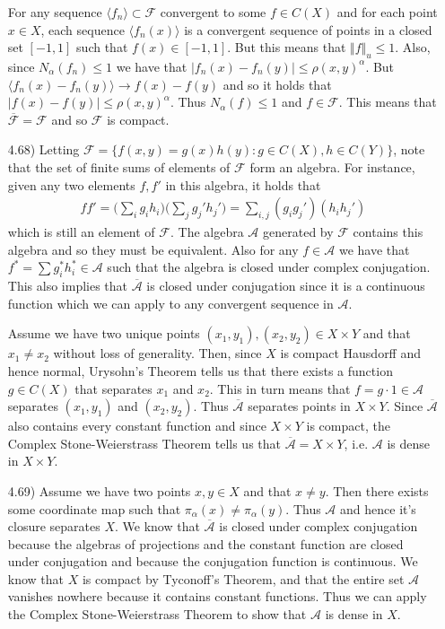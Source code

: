 \documentclass[11pt,letter]{article}
\begin{document}
\begin{enumerate}
    For any sequence $\langle f_n \rangle \subset \mathcal{F}$ convergent to some $f \in C(X)$ and for each point $x \in X$, each sequence $\langle f_n(x)\rangle$ is a convergent sequence of points in a closed set $[-1,1]$ such that $f(x) \in [-1,1]$. But this means that $\Vert f \Vert_u \le 1$. Also, since $N_\alpha(f_n) \le 1$ we have that $\vert f_n(x) - f_n(y) \vert \le \rho(x,y)^\alpha$. But $\langle f_n(x) - f_n(y) \rangle \rightarrow f(x) - f(y)$ and so it holds that $\vert f(x) - f(y) \vert \le \rho(x,y)^\alpha$. Thus $N_\alpha(f) \le 1$ and $f \in \mathcal{F}$. This means that $\overline{\mathcal{F}} = \mathcal{F}$ and so $\mathcal{F}$ is compact.

    \item [4.68)] Letting $\mathcal{F} = \{f(x,y) = g(x)h(y): g \in C(X), h \in C(Y)\}$, note that the set of finite sums of elements of $\mathcal{F}$ form an algebra. For instance, given any two elements $f,f'$ in this algebra, it holds that
    \begin{align*}
        ff' = \Big(\sum_i g_i h_i\Big)\Big(\sum_j g_j' h_j'\Big) = \sum_{i,j}(g_ig_j')(h_ih_j')
    \end{align*}
    which is still an element of $\mathcal{F}$. The algebra $\mathcal{A}$ generated by $\mathcal{F}$ contains this algebra and so they must be equivalent. Also for any $f \in \mathcal{A}$ we have that $f^* = \sum g_i^*h_i^* \in \mathcal{A}$ such that the algebra is closed under complex conjugation. This also implies that $\overline{\mathcal{A}}$ is closed under conjugation since it is a continuous function which we can apply to any convergent sequence in $\mathcal{A}$.

    Assume we have two unique points $(x_1,y_1),(x_2,y_2) \in X \times Y$ and that $x_1 \ne x_2$ without loss of generality. Then, since $X$ is compact Hausdorff and hence normal, Urysohn's Theorem tells us that there exists a function $g \in C(X)$ that separates $x_1$ and $x_2$. This in turn means that $f = g \cdot 1 \in \mathcal{A}$ separates $(x_1,y_1)$ and $(x_2,y_2)$. Thus $\overline{\mathcal{A}}$ separates points in $X \times Y$. Since $\overline{\mathcal{A}}$ also contains every constant function and since $X \times Y$ is compact, the Complex Stone-Weierstrass Theorem tells us that $\overline{\mathcal{A}} = X \times Y$, i.e. $\mathcal{A}$ is dense in $X \times Y$.
    
    \item [4.69)] Assume we have two points $x,y \in X$ and that $x \ne y$. Then there exists some coordinate map such that $\pi_\alpha(x) \ne \pi_\alpha(y)$. Thus $\mathcal{A}$ and hence it's closure separates $X$. We know that $\overline{\mathcal{A}}$ is closed under complex conjugation because the algebras of projections and the constant function are closed under conjugation and because the conjugation function is continuous. We know that $X$ is compact by Tyconoff's Theorem, and that the entire set $\mathcal{A}$ vanishes nowhere because it contains constant functions. Thus we can apply the Complex Stone-Weierstrass Theorem to show that $\mathcal{A}$ is dense in $X$.
\end{enumerate}
\end{document}
